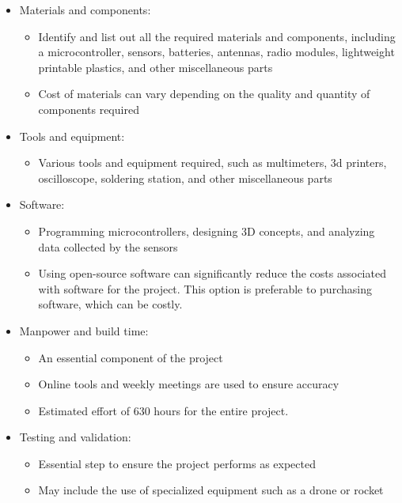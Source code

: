 \documentclass[11pt]{article}
\begin{document}
\begin{itemize}[leftmargin=1cm, itemindent=0.25cm, noitemsep, topsep=0pt, label=$\bullet$]
\item Materials and components:
\begin{itemize}[label=, noitemsep, topsep=1pt]
\item Identify and list out all the required materials and components, including a microcontroller, sensors, batteries, antennas, radio modules, lightweight printable plastics, and other miscellaneous parts
\item Cost of materials can vary depending on the quality and quantity of components required
\end{itemize}
\item Tools and equipment:
\begin{itemize}[label=, noitemsep, topsep=1pt]
\item Various tools and equipment required, such as multimeters, 3d printers, oscilloscope, soldering station, and other miscellaneous parts
\end{itemize}
\item Software:
\begin{itemize}[label=, noitemsep, topsep=1pt]
\item Programming microcontrollers, designing 3D concepts, and analyzing data collected by the sensors
\item Using open-source software can significantly reduce the costs associated with software for the project. This option is preferable to purchasing software, which can be costly.
\end{itemize}
\item Manpower and build time:
\begin{itemize}[label=, noitemsep, topsep=1pt]
\item An essential component of the project
\item Online tools and weekly meetings are used to ensure accuracy
\item Estimated effort of 630 hours for the entire project.
\end{itemize}
\item Testing and validation:
\begin{itemize}[label=, noitemsep, topsep=1pt]
\item Essential step to ensure the project performs as expected
\item May include the use of specialized equipment such as a drone or rocket

\end{itemize}
\end{itemize}
\end{document}
